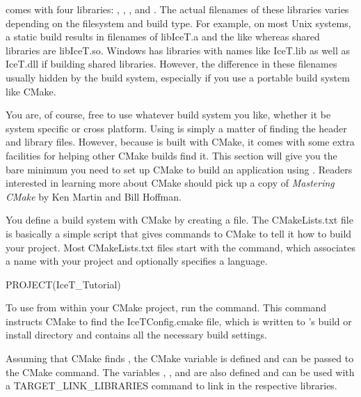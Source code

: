 \IceT comes with four libraries: ,
,
, and
.  The actual filenames of these
libraries varies depending on the filesystem and build type.  For example,
on most Unix systems, a static build results in filenames of
libIceT.a and the like whereas shared libraries are
libIceT.so.  Windows has libraries with names like
IceT.lib as well as IceT.dll if building
shared libraries.  However, the difference in these filenames usually
hidden by the build system, especially if you use a portable build system
like CMake.

You are, of course, free to use whatever build system you like, whether it
be system specific or cross platform.  Using \IceT is simply a matter of
finding the header and library files.  However, because \IceT is built with
CMake, it comes with some extra facilities for helping other
CMake builds find it.  This section will give you the bare minimum you need
to set up CMake to build an application using \IceT.  Readers interested in
learning more about CMake should pick up a copy of \emph{Mastering CMake}
by Ken Martin and Bill Hoffman.

You define a build system with CMake by creating a
 file.  The CMakeLists.txt
file is basically a simple script that gives commands to CMake to tell it
how to build your project.  Most CMakeLists.txt files start with the
 command, which associates a name with your project and
optionally specifies a language.
\begin{code}
PROJECT(IceT_Tutorial)
\end{code}

To use \IceT from within your CMake project, run the
 command.  This command instructs
CMake to find the IceTConfig.cmake file, which is
written to \IceT's build or install directory and contains all the
necessary build settings.

Assuming that CMake finds \IceT, the CMake variable
 is defined and can be passed to the
 CMake command.
The variables , , and
 are also defined and can be used with a
TARGET\_LINK\_LIBRARIES command to link in
the respective \IceT libraries.


